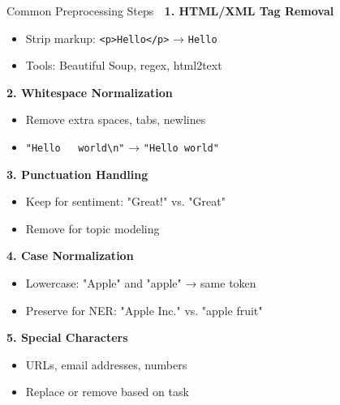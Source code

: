 \documentclass[aspectratio=169]{beamer}
\begin{document}
\begin{frame}[shrink=10]{Common Preprocessing Steps 🔧}
    \textbf{1. HTML/XML Tag Removal}
    \begin{itemize}\setlength{\itemsep}{0pt}
        \item Strip markup: \texttt{<p>Hello</p>} → \texttt{Hello}
        \item Tools: Beautiful Soup, regex, html2text
    \end{itemize}

    \vspace{0.3em}
    \textbf{2. Whitespace Normalization}
    \begin{itemize}\setlength{\itemsep}{0pt}
        \item Remove extra spaces, tabs, newlines
        \item \texttt{"Hello\ \ \ world\textbackslash n"} → \texttt{"Hello world"}
    \end{itemize}

    \vspace{0.3em}
    \textbf{3. Punctuation Handling}
    \begin{itemize}\setlength{\itemsep}{0pt}
        \item Keep for sentiment: "Great!" vs. "Great"
        \item Remove for topic modeling
    \end{itemize}

    \vspace{0.3em}
    \textbf{4. Case Normalization}
    \begin{itemize}\setlength{\itemsep}{0pt}
        \item Lowercase: "Apple" and "apple" → same token
        \item Preserve for NER: "Apple Inc." vs. "apple fruit"
    \end{itemize}

    \vspace{0.3em}
    \textbf{5. Special Characters}
    \begin{itemize}\setlength{\itemsep}{0pt}
        \item URLs, email addresses, numbers
        \item Replace or remove based on task
    \end{itemize}
\end{frame}
\end{document}
